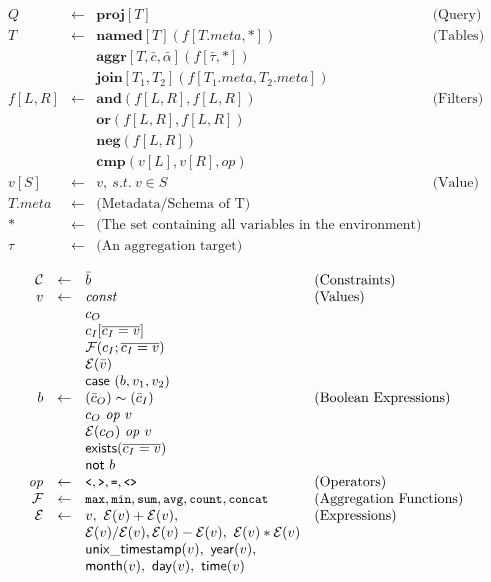 \documentclass[letter, notitlepage]{article}
\newcommand{\code}[1]{\texttt{\small #1}}
\begin{document}
\[
\begin{array}{rcll}
	Q 		 & \leftarrow & \mathbf{proj}[T] & \text{(Query)}\\
	T 		 & \leftarrow & \mathbf{named}[T](f[T.\mathit{meta}, *]) & \text{(Tables)}\\
				 & 						& \mathbf{aggr}[T,\bar{c},\bar{\alpha}](f[\bar\tau, *])\\
				 & 						& \mathbf{join}[T_1, T_2](f[T_1.\mathit{meta}, T_2.\mathit{meta}])\\
	f[L,R] & \leftarrow & \mathbf{and}(f[L,R],f[L,R]) & \text{(Filters)}\\
				 & 						& \mathbf{or}(f[L,R],f[L,R])\\
				 & 						& \mathbf{neg}(f[L,R])\\
				 & 						& \mathbf{cmp}(v[L], v[R], \mathit{op})\\
	v[S] 	 & \leftarrow & v,~s.t.~v\in S & \text{(Value)}\\
	T.\mathit{meta} & \leftarrow & \text{(Metadata/Schema of T)}\\
	* & \leftarrow & \text{(The set containing all variables in the environment)}\\
	\tau & \leftarrow & \text{(An aggregation target)}
\end{array}
\]

\[
\begin{array}{rcll}
 \mathcal{C} & \leftarrow & \bar{b} & \text{(Constraints)}\\
v & \leftarrow & \mathit{const} & \text{(Values)}\\
	& & {c}_{O}\\
	& & c_I[\overline{c_I = v}]\\
	& & \mathcal{F}(c_I; \overline{c_I = v})\\
	& & \mathcal{E}(\bar{v})\\
	& & \mathsf{case}~(b, v_1, v_2)\\
b & \leftarrow & (\bar{c}_O) \sim (\bar{c}_I) & \text{(Boolean Expressions)}\\
	& & c_O~\mathit{op}~v\\
	& & \mathcal{E}(c_O)~\mathit{op}~v\\
	& & \mathsf{exists}(\overline{c_I=v})\\
	& & \mathsf{not}~b\\
\mathit{op} & \leftarrow & \code{<}, \code{>}, \code{=}, \code{<>} & \text{(Operators)}\\
\mathcal{F} & \leftarrow & \code{max}, \code{min}, \code{sum}, \code{avg}, \code{count}, \code{concat} & \text{(Aggregation Functions)}\\
\mathcal{E}	& \leftarrow & v,~\mathcal{E}(v) + \mathcal{E}(v), & \text{(Expressions)}\\
						& & \mathcal{E}(v) / \mathcal{E}(v), \mathcal{E}(v) - \mathcal{E}(v),~\mathcal{E}(v) * \mathcal{E}(v)\\
						& & \mathsf{unix\_timestamp}(v),~\mathsf{year}(v),\\
						& & \mathsf{month}(v),~\mathsf{day}(v),~\mathsf{time}(v)
\end{array}
\]
\end{document}
